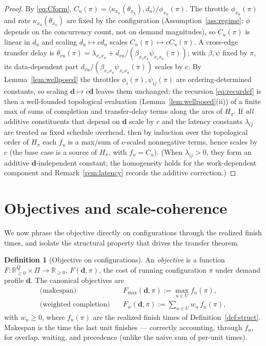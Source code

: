 \documentclass{amsart}
\theoremstyle{definition}
\newtheorem{definition}{Definition}
\begin{document}
\begin{proof}
By \eqref{eq:Cform}, $C_u(\pi)=\langle\kappa_{x_u}(\theta_{x_u}),d_u\rangle/\phi_{x_u}(\pi)$.
The throttle $\phi_{x_u}(\pi)$ and rate $\kappa_{x_u}(\theta_{x_u})$ are fixed
by the configuration (Assumption~\ref{ass:regime}: $\phi$ depends on the
concurrency count, not on demand magnitudes), so $C_u(\pi)$ is linear in $d_u$
and scaling $d_u\mapsto cd_u$ scales $C_u(\pi)\mapsto cC_u(\pi)$. A cross-edge
transfer delay is $\theta_{vu}(\pi)=\lambda_{x_vx_u}+
d_{vu}/(\beta_{x_vx_u}\psi_{x_vx_u}(\pi))$; with $\beta,\psi$ fixed by $\pi$, its
data-dependent part $d_{vu}/(\beta_{x_vx_u}\psi_{x_vx_u}(\pi))$ scales by $c$.
By Lemma~\ref{lem:wellposed} the throttles $\phi_i(\pi),\psi_{ij}(\pi)$ are
ordering-determined constants, so scaling $\mathbf d\mapsto c\mathbf d$ leaves
them unchanged; the recursion \eqref{eq:recurdef} is then a well-founded
topological evaluation (Lemma~\ref{lem:wellposed}(ii)) of a finite max of sums of
completion and transfer-delay terms along the arcs of $H_\pi$. If \emph{all}
additive constituents that depend on $\mathbf d$ scale by $c$ and the latency
constants $\lambda_{ij}$ are treated as fixed schedule overhead, then by
induction over the topological order of $H_\pi$ each $f_u$ is a max/sum of
$c$-scaled nonnegative terms, hence scales by $c$ (the base case is a source of
$H_\pi$, with $f_u=C_u$). (When
$\lambda_{ij}>0$, they form an additive $\mathbf d$-independent constant; the
homogeneity holds for the work-dependent component and
Remark~\ref{rem:latency} records the additive correction.)
\end{proof}

\section{Objectives and scale-coherence}\label{sec:objective}

We now phrase the objective directly on configurations through the realized
finish times, and isolate the structural property that drives the transfer
theorem.

\begin{definition}[Objective on configurations]\label{def:obj}
An \emph{objective} is a function $F\colon\mathbb{R}^Q_{\ge0}\times\Pi\to
\mathbb{R}_{\ge0}$, $F(\mathbf d,\pi)$, the cost of running configuration $\pi$
under demand profile $\mathbf d$. The canonical objectives are
\begin{align}
\text{(makespan)}\quad &F_{\max}(\mathbf d,\pi):=\max_{u\in U} f_u(\pi),
\label{eq:makespan}\\
\text{(weighted completion)}\quad &F_{w}(\mathbf d,\pi):=\sum_{u\in U} w_u\, f_u(\pi),
\label{eq:wsum}
\end{align}
with $w_u\ge0$, where $f_u(\pi)$ are the realized finish times of
Definition~\ref{def:struct}. Makespan is the time the last unit finishes —
correctly accounting, through $f_u$, for overlap, waiting, and precedence
(unlike the naive sum of per-unit times).
\end{definition}
\end{document}
